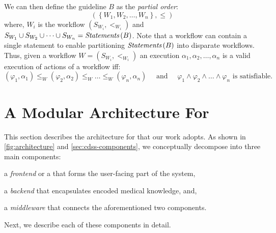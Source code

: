 
We can then define the guideline $B$ as the \emph{partial order}:
\begin{equation}
  \left(\left\{W_1,W_2,\dots,W_n\right\}, \leq\right)
\end{equation}
where, $W_i$ is the workflow $\left(S_{W_i}, <_{W_i}\right)$ and
$S_{W_1} \cup S_{W_2} \cup \dots \cup S_{W_n} = \textit{Statements}\left(B\right)$. Note that a
workflow can contain a single statement to enable partitioning $\textit{Statements}\left(B\right)$
into disparate workflows. Thus, given a workflow $W =\left(S_{W_i},
    <_{W_i}\right)$  an execution
$\alpha_1,\alpha_2,\dots,\alpha_n$ is a valid execution of actions of a workflow
iff:
\begin{equation}
  \left(\varphi_1,\alpha_1\right) \leq_W \left(\varphi_2,\alpha_2\right) \leq_W \dots \leq_W \left(\varphi_n,\alpha_n\right)
  \quad\text{ and }\quad
  \varphi_1 \wedge \varphi_2 \wedge \dots \wedge \varphi_n \text{ is satisfiable.}
\end{equation}

\section{A Modular Architecture For \CDSSs{}}\label{sec:modular-cdss-architecture}
This section describes the architecture for \CDSSs{}
that our work adopts. As shown in \figurename{} \ref{fig:architecture}
and \autoref{sec:cdss-components}, we conceptually
decompose \CDSSs{} into three main components:
\begin{enumerate*}[label=(\roman*)]
    \item a \emph{frontend} or a \UI{} that forms the user-facing part of the system,
    \item a \emph{backend} that encapsulates encoded medical knowledge, and,
    \item a \emph{middleware} that connects the aforementioned two components.
\end{enumerate*}
Next, we describe each of these components in detail.

